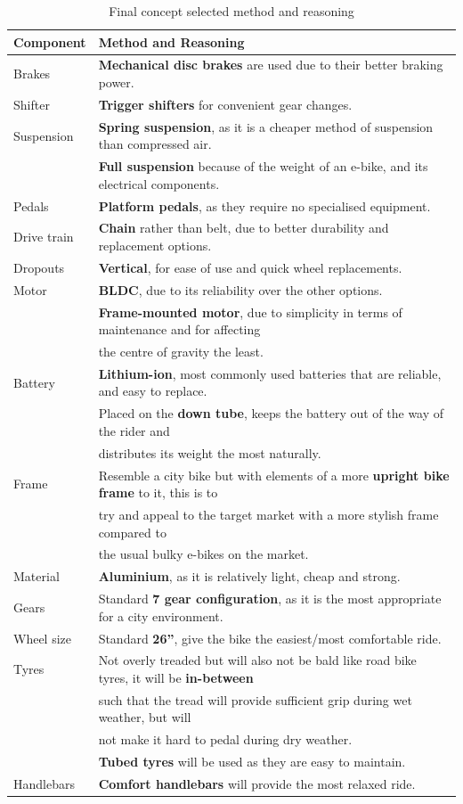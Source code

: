 \documentclass[a4paper,11pt]{article}
\begin{document}
\begingroup
\onehalfspacing
\begin{longtable}{l l}
	\caption{Final concept selected method and reasoning}\\
		\hline
		Component&Method and Reasoning\\\hline
		Brakes&\textbf{Mechanical disc brakes} are used due to their better braking power.\\
		Shifter&\textbf{Trigger shifters} for convenient gear changes.\\
		Suspension&\textbf{Spring suspension}, as it is a cheaper method of suspension than compressed air.\\
			  &\textbf{Full suspension} because of the weight of an e-bike, and its electrical components.\\ 
		Pedals&\textbf{Platform pedals}, as they require no specialised equipment.\\
		Drive train&\textbf{Chain} rather than belt, due to better durability and replacement options.\\ 
		Dropouts&\textbf{Vertical}, for ease of use and quick wheel replacements.\\
		Motor&\textbf{BLDC}, due to its reliability over the other options.\\
		     &\textbf{Frame-mounted motor}, due to simplicity in terms of maintenance and for affecting\\
		     &\phantom{WW} the centre of gravity the least.\\ 
		Battery&\textbf{Lithium-ion}, most commonly used batteries that are reliable, and easy to replace.\\
		       &Placed on the \textbf{down tube}, keeps the battery out of the way of the rider and \\
		       &\phantom{WW} distributes its weight the most naturally.\\
		Frame&Resemble a city bike but with elements of a more \textbf{upright bike frame} to it, this is to\\
		     &\phantom{WW} try and appeal to the target market with a more stylish frame compared to\\
		     &\phantom{WW} the usual bulky e-bikes on the market.\\
		Material&\textbf{Aluminium}, as it is relatively light, cheap and strong. \\
		Gears&Standard \textbf{7 gear configuration}, as it is the most appropriate for a city environment.\\ 
		Wheel size&Standard \textbf{26''}, give the bike the easiest/most comfortable ride.\\
		Tyres&Not overly treaded but will also not be bald like road bike tyres, it will be \textbf{in-between}\\
		     &\phantom{WW} such that the tread will provide sufficient grip during wet weather, but will \\
		     &\phantom{WW} not make it hard to pedal during dry weather.\\
		     &\textbf{Tubed tyres} will be used as they are easy to maintain.\\
		Handlebars&\textbf{Comfort handlebars} will provide the most relaxed ride. 
\end{longtable}
\endgroup
\end{document}
